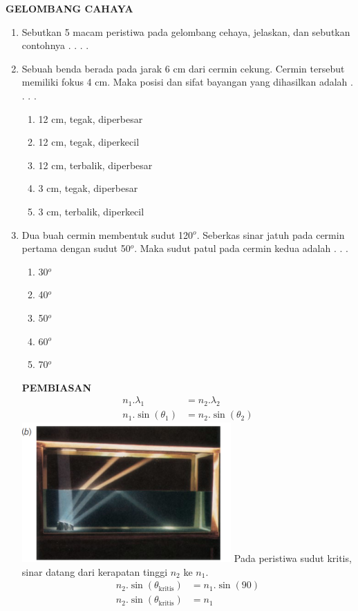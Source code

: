 \documentclass[10pt,a4paper]{extarticle}
\newcommand*\pilgan[1]{
\begin{enumerate}[label=\Alph*., itemsep=0pt,topsep=0pt,leftmargin=*,align=Center] #1 
\end{enumerate}}
\newcommand{\pilgani}[1]{                            \vspace{-0.3cm}\begin{multicols}{2}
 \begin{enumerate}[label=\Alph*., itemsep=0pt,topsep=0pt,leftmargin=*,align=Center]#1                     \end{enumerate}
 \phantom{ini cuma sapi, wedus, dan ayam}
 \end{multicols}}
\begin{document}
 \textbf{GELOMBANG CAHAYA} \phantom{ini nama siswa yang aaamengerjakan soal kuis ini }  

\begin{multicols*}{2}

\begin{enumerate}
\item Sebutkan 5 macam peristiwa pada gelombang cehaya, jelaskan, dan sebutkan contohnya . . . .

\vspace{3cm}

\item Sebuah benda berada pada jarak 6 cm dari cermin cekung. Cermin tersebut memiliki fokus 4 cm. Maka posisi dan sifat bayangan yang dihasilkan adalah . . . .
\pilgan{
        \item 12 cm, tegak, diperbesar
        \item 12 cm, tegak, diperkecil
        \item 12 cm, terbalik, diperbesar
        \item 3 cm, tegak, diperbesar
        \item 3 cm, terbalik, diperkecil
        }

\item Dua buah cermin membentuk sudut 120$^o$. Seberkas sinar jatuh pada cermin pertama dengan sudut 50$^o$. Maka sudut patul pada cermin kedua adalah . . . 
\pilgani{
        \item 30$^o$
        \item 40$^o$
        \item 50$^o$
        \item 60$^o$
        \item 70$^o$
        }

\vspace{3cm}

\textbf{PEMBIASAN}
\begin{align*}
n_1.\lambda_1 &= n_2.\lambda_2 \\
n_1.\sin(\theta_1) &=n_2.\sin(\theta_2)
\end{align*}
\includegraphics[width=8cm]{pic/kritis}
Pada peristiwa sudut kritis, sinar datang dari kerapatan tinggi $n_2$ ke $n_1$.
\begin{align*}
n_2.\sin(\theta_{\text{kritis}}) &=n_1.\sin(90)\\
n_2.\sin(\theta_{\text{kritis}}) &=n_1
\end{align*}



\end{enumerate}
\end{multicols*}
\end{document}
